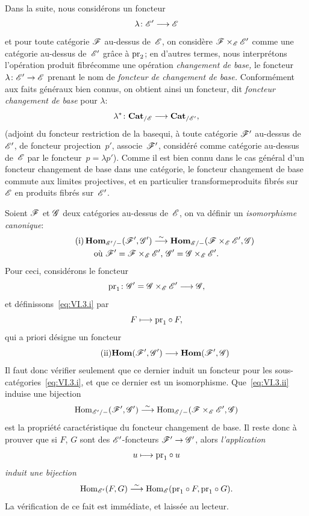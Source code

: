 Dans la suite, nous consid\'erons un foncteur
$$
\lambda\colon\cal{E}'\to\cal{E}
$$
et pour toute cat\'egorie $\cal{F}$ au-dessus de~$\cal{E}$, on
consid\`ere $\cal{F}\times_\cal{E}\cal{E}'$ comme une cat\'egorie
au-dessus de~$\cal{E}'$ gr\^ace \`a $\mathrm{pr}_2$; en d'autres termes,
nous interpr\'etons l'op\'eration \og produit fibr\'e\fg comme une
op\'eration \emph{\og changement de base\fg,} le foncteur
$\lambda\colon\cal{E}'\to\cal{E}$ prenant le nom de \emph{\og foncteur
de changement de base\fg.}
Conform\'ement aux faits g\'en\'eraux bien connus, on obtient
ainsi un foncteur, dit
\emph{foncteur changement de base} pour $\lambda$:
$$
\lambda^*\colon\Cat_{/\cal{E}}\to\Cat_{/\cal{E}'}\quoi,
$$
\label{indnot:fl}(adjoint du foncteur \og restriction de la base\fg qui, \`a toute
cat\'egorie $\cal{F}'$ au-dessus de~$\cal{E}'$, de foncteur
projection~$p'$, associe~$\cal{F}'$, consid\'er\'e comme
cat\'egorie au-dessus de~$\cal{E}$ par le foncteur~$p=\lambda
p'$). Comme il est bien connu dans le cas g\'en\'eral d'un
foncteur changement de base dans une cat\'egorie, le foncteur
changement de base \og commute aux limites projectives\fg, et en
particulier \og transforme\fg produits fibr\'es sur~$\cal{E}$ en
produits fibr\'es sur~$\cal{E}'$.

Soient $\cal{F}$ et $\cal{G}$ deux cat\'egories au-dessus
de~$\cal{E}$, on va d\'efinir un \emph{isomorphisme canonique}:
\begin{multline*}
\label{eq:VI.3.i}
\tag{i}
\SheafHom_{\cal{E}'/-}(\cal{F}',\cal{G}')\isomto
\SheafHom_{\cal{E}/-}(\cal{F}\times_{\cal{E}}\cal{E}',\cal{G})\\
\text{où }\cal{F}'=\cal{F}\times_{\cal{E}}\cal{E}'\text{, }
\cal{G}'=\cal{G}\times_{\cal{E}}\cal{E}'.
\end{multline*}
Pour ceci, consid\'erons le foncteur
$$
\pr_1\colon\cal{G}'=\cal{G}\times_{\cal{E}}\cal{E}'\to \cal{G}\quoi,
$$
et d\'efinissons~\eqref{eq:VI.3.i} par
$$
F\mto \pr_1\circ F\quoi,
$$
qui a priori d\'esigne un foncteur
\begin{equation*}
\label{eq:VI.3.ii}
\tag{ii} {\SheafHom(\cal{F}',\cal{G}')\to\SheafHom(\cal{F}',\cal{G})}
\end{equation*}
Il faut donc v\'erifier seulement que ce dernier induit un foncteur
pour les sous-cat\'egories~\eqref{eq:VI.3.i}, et que ce dernier est
un isomorphisme. Que~\eqref{eq:VI.3.ii} induise une bijection
$$
\Hom_{\cal{E}'/-}(\cal{F}',\cal{G}')\isomto
\Hom_{\cal{E}/-}(\cal{F}\times_{\cal{E}}\cal{E}',\cal{G})
$$
est la propri\'et\'e caract\'eristique du foncteur changement de
base. Il reste donc \`a
prouver que si $F$, $G$ sont des $\cal{E}'$-foncteurs
$\cal{F}'\to\cal{G}'$, alors \emph{l'application}
$$
u\mto \pr_1\circ u
$$
\emph{induit une bijection}
$$
\Hom_{\cal{E}'}(F,G)\isomto\Hom_{\cal{E}}(\pr_1\circ F,\pr_1\circ
G)\quoi.
$$
La v\'erification de ce fait est imm\'ediate, et laiss\'ee au
lecteur.

